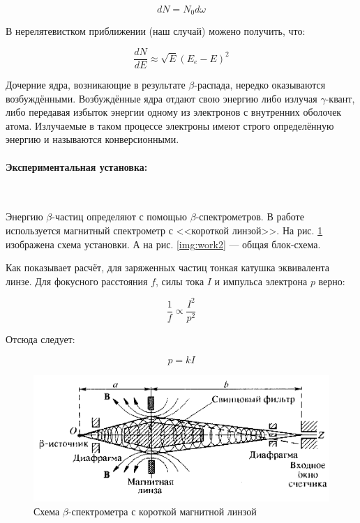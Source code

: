 \documentclass[a4paper, 12pt]{article}
\newcommand{\parag}[1]{\paragraph*{#1:}}
\begin{document}
\begin{equation}
    dN = N_0 d\omega
\end{equation}

В нерелятевистком приближении (наш случай) можено получить, что:

\begin{equation}
    \frac{dN}{dE} \approx \sqrt{E} (E_e - E)^2
\end{equation}

Дочерние ядра, возникающие в результате $\beta$-распада, нередко оказываются возбуждёнными. Возбуждённые ядра отдают свою энергию либо излучая $\gamma$-квант, либо передавая избыток энергии одному из электронов с внутренних оболочек атома. Излучаемые в таком процессе электроны имеют строго определённую энергию и называются конверсионными.

\parag {Экспериментальная установка} ~

Энергию $\beta$-частиц определяют с помощью $\beta$-спектрометров. В работе используется магнитный спектрометр с <<короткой линзой>>. На рис. \ref{img:work1} изображена схема установки. А на рис. \ref{img:work2} --- общая блок-схема.

Как показывает расчёт, для заряженных частиц тонкая катушка эквивалента линзе. Для фокусного расстояния $f$, силы тока $I$ и импульса электрона $p$ верно:

\[
    \frac{1}{f} \propto \frac{I^2}{p^2}
\]

Отсюда следует:

\begin{equation}
    p = k I
    \label{eq:coef}
\end{equation}

\begin{figure}[!h]
    \includegraphics[scale = 0.4]{Workplace1}
    \centering
    \caption{Схема $\beta$-спектрометра с короткой магнитной линзой}
    \label{img:work1}
\end{figure}
\end{document}
